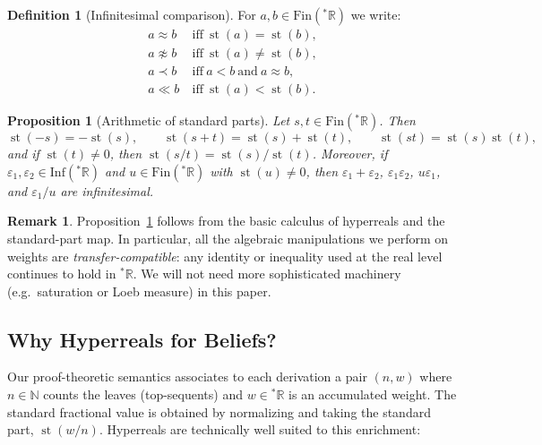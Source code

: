 \documentclass[12pt,a4paper,reqno]{amsart}
\newtheorem{proposition}[theorem]{Proposition}
\theoremstyle{definition}
\newtheorem{definition}[theorem]{Definition}
\newtheorem{remark}[theorem]{Remark}
\newcommand{\numberset}{\mathbb}
\newcommand{\N}{\numberset{N}}
\newcommand{\R}{\numberset{R}}
\DeclareMathOperator{\st}{st}
\newcommand{\Rstar}{{}^{\ast}\R}
\newcommand{\Fin}{\mathrm{Fin}}
\newcommand{\Inf}{\mathrm{Inf}}
\begin{document}
\begin{definition}[Infinitesimal comparison]\label{def:hyperreal-notation}
For $a,b\in\Fin(\Rstar)$ we write:
\begin{align*}
 a \approx b \ &\text{iff}\ \st(a)=\st(b),\\
 a \not\approx b \ &\text{iff}\ \st(a)\neq \st(b),\\
 a \prec b \ &\text{iff}\ a<b\ \text{and}\ a\approx b,\\
 a \ll b \ &\text{iff}\ \st(a)<\st(b).
\end{align*}
\end{definition}

\begin{proposition}[Arithmetic of standard parts]\label{prop:st-arithmetic}
Let $s,t\in\Fin(\Rstar)$. Then
\[
\st(-s)=-\st(s),\qquad
\st(s+t)=\st(s)+\st(t),\qquad
\st(st)=\st(s)\st(t),
\]
and if $\st(t)\neq 0$, then $\st(s/t)=\st(s)/\st(t)$.
Moreover, if $\varepsilon_1,\varepsilon_2\in\Inf(\Rstar)$ and $u\in\Fin(\Rstar)$ with $\st(u)\neq 0$, then
$\varepsilon_1+\varepsilon_2$, $\varepsilon_1\varepsilon_2$, $u\varepsilon_1$, and $\varepsilon_1/u$ are infinitesimal.
\end{proposition}

\begin{remark}
Proposition~\ref{prop:st-arithmetic} follows from the basic calculus of hyperreals and the standard-part map.
In particular, all the algebraic manipulations we perform on weights are \emph{transfer-compatible}: any identity or inequality used at the real level continues to hold in $\Rstar$.
We will not need more sophisticated machinery (e.g.\ saturation or Loeb measure) in this paper.
\end{remark}

\subsection{Why Hyperreals for Beliefs?}
\label{subsec:why-hyperreals}

Our proof-theoretic semantics associates to each derivation a pair $(n,w)$ where $n\in\N$ counts the leaves (top-sequents) and $w\in\Rstar$ is an accumulated weight.
The standard fractional value is obtained by normalizing and taking the standard part, $\st(w/n)$.
Hyperreals are technically well suited to this enrichment:
\end{document}
